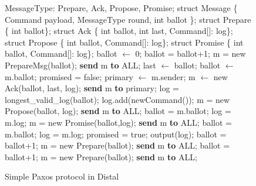 \begin{figure}[h]
\begin{algorithmic}[1]
\scriptsize
\State MessageType: Prepare, Ack, Propose, Promise;
\State struct Message \{ Command payload, MessageType round, int ballot \};
\State struct Prepare \{ int ballot\}; 
\State struct Ack \{ int ballot, int last, Command[]: log\};
\State struct Propose \{ int ballot, Command[]: log\};
\State struct Promise \{ int ballot, Command[]: log\};
\Init
    \State ballot $\leftarrow$ 0;
        \State ballot = ballot+1;
        \State m = new PrepareMsg(ballot);
    	\State \textbf{send} m \textbf{to} ALL;
    \EndIf
\EndInit
{}
     \label{example:prepare} 
        \State last $\leftarrow$ ballot; %
        \State ballot $\leftarrow$ m.ballot; promised = false; primary $\leftarrow$ m.sender;
        \State m $\leftarrow$ new Ack(ballot, last, log); \label{example:ackstart}
        \State \textbf{send} m \textbf{to} primary;
    \EndUpon
    \label{example:ack}
        \State log = longest\_valid\_log(ballot); log.add(newCommand());\label{example:newCommand}
        \State m = new Propose(ballot, log);
        \State \textbf{send} m \textbf{to} ALL;
    \EndUpon
     \label{example:propose} 
        \State ballot = m.ballot; log = m.log;
        \State m = new Promise(ballot,log);
        \State \textbf{send} m \textbf{to} ALL;
    \EndUpon
     \label{example:promise}
        \State ballot = m.ballot; log = m.log; promised = true; output(log);\label{example:output}
            \State ballot = ballot+1;
            \State m = new Prepare(ballot); \textbf{send} m \textbf{to} ALL;
        \EndIf
    \EndUpon
     \label{example:timeout}
            \State ballot = ballot+1;
            \State m = new Prepare(ballot);
        	\State \textbf{send} m \textbf{to} ALL;
        \EndIf
    \EndUpon
\EndWhile
\end{algorithmic} 
\caption{Simple Paxos protocol in Distal}
\label{fig:example}
\end{figure}

